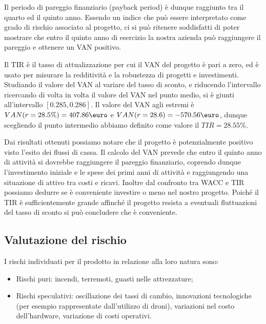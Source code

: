 Il periodo di pareggio finanziario (payback period) è dunque raggiunto tra il
quarto ed il quinto anno. Essendo un indice che può essere interpretato come
grado di rischio associato al progetto, ci si può ritenere soddisfatti di poter
mostrare che entro il quinto anno di esercizio la nostra azienda può raggiungere
il pareggio e ottenere un VAN positivo.

Il TIR è il tasso di attualizzazione per cui il VAN del progetto è pari a zero, 
ed è usato per misurare la redditività e la robustezza di progetti e investimenti.
Studiando il valore del VAN al variare del tasso di sconto, e riducendo
l’intervallo ricercando di volta in volta il valore del VAN nel punto medio,
si è giunti all’intervallo \mbox{$[0.285, 0.286]$}. Il valore del VAN agli estremi è
$VAN(r = 28.5\%) = 407.86 \mbox{\euro}$ e $VAN(r=28.6) = -570.56 \mbox{\euro}$,
dunque scegliendo il punto intermedio abbiamo definito come valore il $TIR = 28.55\%$.

Dai risultati ottenuti possiamo notare che il progetto è potenzialmente positivo
visto l'esito dei flussi di cassa. Il calcolo del VAN prevede che entro il quinto
anno di attività si dovrebbe raggiungere il pareggio finanziario, coprendo
dunque l’investimento iniziale e le spese dei primi anni di attività e
raggiungendo una situazione di attivo tra costi e ricavi.  Inoltre dal confronto
tra WACC e TIR possiamo dedurre se è conveniente investire o meno nel nostro
progetto. Poiché il TIR è sufficientemente grande affinché il progetto resista
a eventuali fluttuazioni del tasso di sconto si può concludere che è
conveniente.
\subsection{Valutazione del rischio}
I rischi individuati per il prodotto in relazione alla loro natura sono:
\begin{itemize}
\item Rischi puri: incendi, terremoti, guasti nelle attrezzature;
\item Rischi speculativi: oscillazione dei tassi di cambio, innovazioni
tecnologiche (per esempio rappresentate dall’utilizzo di droni), variazioni nel
costo dell’hardware, variazione di costi operativi.
\end{itemize}

